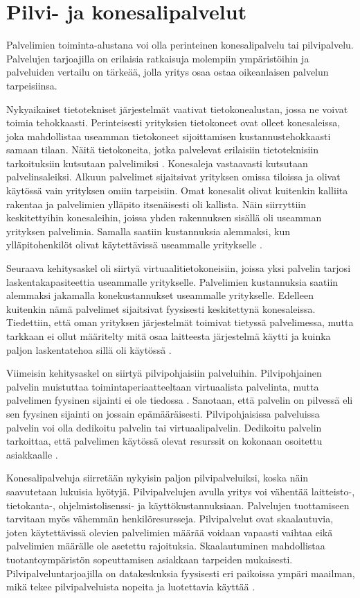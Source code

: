 \chapter{Pilvi- ja konesalipalvelut\label{konesalipalvelut}}
Palvelimien toiminta-alustana voi olla perinteinen konesalipalvelu tai pilvipalvelu. Palvelujen tarjoajilla on erilaisia ratkaisuja molempiin ympäristöihin ja palveluiden vertailu on tärkeää, jolla yritys osaa ostaa oikeanlaisen palvelun tarpeisiinsa. 

Nykyaikaiset tietotekniset järjestelmät vaativat tietokonealustan, jossa ne voivat toimia tehokkaasti. Perinteisesti yrityksien tietokoneet ovat olleet konesaleissa, joka mahdollistaa useamman tietokoneet sijoittamisen kustannustehokkaasti samaan tilaan. Näitä tietokoneita, jotka palvelevat erilaisiin tietoteknisiin tarkoituksiin kutsutaan palvelimiksi \citep{server_computing}. Konesaleja vastaavasti kutsutaan palvelinsaleiksi. Alkuun palvelimet sijaitsivat yrityksen omissa tiloissa ja olivat käytössä vain yrityksen omiin tarpeisiin. Omat konesalit olivat kuitenkin kalliita rakentaa ja palvelimien ylläpito itsenäisesti oli kallista. Näin siirryttiin keskitettyihin konesaleihin, joissa yhden rakennuksen sisällä oli useamman yrityksen palvelimia. Samalla saatiin kustannuksia alemmaksi, kun ylläpitohenkilöt olivat käytettävissä useammalle yritykselle \citep{server_room}.

Seuraava kehitysaskel oli siirtyä virtuaalitietokoneisiin, joissa yksi palvelin tarjosi laskentakapasiteettia useammalle yritykselle. Palvelimien kustannuksia saatiin alemmaksi jakamalla konekustannukset useammalle yritykselle. Edelleen kuitenkin nämä palvelimet sijaitsivat fyysisesti keskitettynä konesaleissa. Tiedettiin, että oman yrityksen järjestelmät toimivat tietyssä palvelimessa, mutta tarkkaan ei ollut määritelty mitä osaa laitteesta järjestelmä käytti ja kuinka paljon laskentatehoa sillä oli käytössä \citep{virtual_server}.

Viimeisin kehitysaskel on siirtyä pilvipohjaisiin palveluihin. Pilvipohjainen palvelin muistuttaa toimintaperiaatteeltaan virtuaalista palvelinta, mutta palvelimen fyysinen sijainti ei ole tiedossa \citep{cloud_computing}. Sanotaan, että palvelin on pilvessä eli sen fyysinen sijainti on jossain epämääräisesti. Pilvipohjaisissa palveluissa palvelin voi olla dedikoitu palvelin tai virtuaalipalvelin. Dedikoitu palvelin tarkoittaa, että palvelimen käytössä olevat resurssit on kokonaan osoitettu asiakkaalle \citep{dedicated_hosting}.

Konesalipalveluja siirretään nykyisin paljon pilvipalveluiksi, koska näin saavutetaan lukuisia hyötyjä. Pilvipalvelujen avulla yritys voi vähentää laitteisto-, tietokanta-, ohjelmistolisenssi- ja käyttökustannuksiaan. Palvelujen tuottamiseen tarvitaan myös vähemmän henkilöresursseja. Pilvipalvelut ovat skaalautuvia, joten käytettävissä olevien palvelimien määrää voidaan vapaasti vaihtaa eikä palvelimien määrälle ole asetettu rajoituksia. Skaalautuminen mahdollistaa tuotantoympäristön sopeuttamisen asiakkaan tarpeiden mukaisesti. Pilvipalveluntarjoajilla on datakeskuksia fyysisesti eri paikoissa ympäri maailman, mikä tekee pilvipalveluista nopeita ja luotettavia käyttää \citep{top_cloud}.

